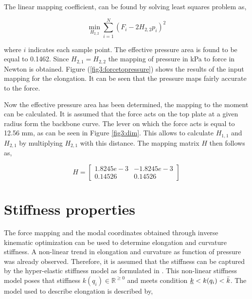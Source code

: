 The linear mapping coefficient, can be found by solving least squares problem as,

\begin{equation}
\min_{H_{2,2}} \sum_{i=1}^{N} (F_i - 2 H_{2,2} p_i)^2
\label{eq3:forcefitting}
\end{equation}

where $i$ indicates each sample point. The effective pressure area is found to be equal to 0.1462. Since $H_{2,1} = H_{2,2}$ the mapping of pressure in kPa to force in Newton is obtained. Figure (\ref{fig3:forcetopressure}) shows the results of the input mapping for the elongation. It can be seen that the pressure maps fairly accurate to the force.

Now the effective pressure area has been determined, the mapping to the moment can be calculated. It is assumed that the force acts on the top plate at a given radius form the backbone curve. The lever on which the force acts is equal to 12.56 mm, as can be seen in Figure \ref{fig3:dim}. This allows to calculate $H_{1,1}$ and $H_{2,1}$ by multiplying $H_{2,1}$ with this distance. The mapping matrix $H$ then follows as,

\begin{equation}
    H =  \begin{bmatrix} 1.8245e-3 & -1.8245e-3 \\
    0.14526 & 0.14526\end{bmatrix}  
\end{equation}





\section{Stiffness properties}

The force mapping and the modal coordinates obtained through inverse kinematic optimization can be used to determine elongation and curvature stiffness. A non-linear trend in elongation and curvature as function of pressure was already observed. Therefore, it is assumed that the stiffness can be captured by the hyper-elastic stiffness model as formulated in \cite{Caasenbrood2020StiffnessModel}. This non-linear stiffness model poses that stiffness $k(q_i) \in \mathbb{R}^{\geq 0}$ and meets condition $\underbar{$k$} < k(q_i) < \Bar{k}$. The model used to describe elongation is described by,

